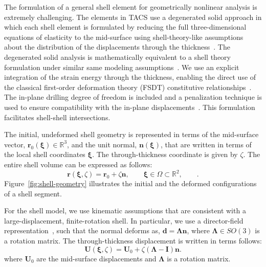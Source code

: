 \documentclass[]{aiaa-tc}
\newcommand{\mb}{\mathbf}
\newcommand{\mbs}{\boldsymbol}
\begin{document}
The formulation of a general shell element for geometrically nonlinear
analysis is extremely challenging. The elements in TACS use a
degenerated solid approach in which each shell element is formulated
by reducing the full three-dimensional equations of elasticity to the
mid-surface using shell-theory-like assumptions about the distribution
of the displacements through the thickness~\cite{Ahmad:1970:ATS,
  Bathe:1980:GMN, Parisch:1978:GNA, Hughes:1981:NFE}.  The degenerated
solid analysis is mathematically equivalent to a shell theory
formulation under similar same modeling
assumptions~\cite{Buechter:1992:STD}.  We use an explicit integration
of the strain energy through the thickness, enabling the direct use of
the classical first-order deformation theory (FSDT) constitutive
relationships~\cite{Milford:1986:DIF, Buechter:1992:STD}. The
in-plane drilling degree of freedom is included and a penalization
technique is used to ensure compatibility with the in-plane
displacements~\cite{Hughes:1989:DDF, Simo:1992:FFE,
  Fox:1992:DRF}. This formulation facilitates shell-shell
intersections.

The initial, undeformed shell geometry is represented in terms of the
mid-surface vector, $\mb{r}_{0}(\mbs{\xi}) \in \mathbb{R}^{3}$, and
the unit normal, $\mb{n}(\mbs{\xi})$, that are written in terms of the
local shell coordinates $\mbs{\xi}$. The through-thickness coordinate
is given by $\zeta$. The entire shell volume can be expressed as
follows:
%
\begin{equation} 
  \mb{r}(\mbs{\xi}, \zeta) = 
  \mb{r}_{0} + \zeta \mb{n}, 
  \qquad \mbs{\xi} \in \Omega \subset \mathbb{R}^{2}, \qquad.
  \label{eqn:mid-surface}
\end{equation}
Figure~\ref{fig:shell-geometry} illustrates the initial and the deformed
configurations of a shell segment. 

For the shell model, we use kinematic assumptions that are consistent
with a large-displacement, finite-rotation shell. In particular, we
use a director-field representation~\cite{Simo:1989:SRG1}, such that
the normal deforms as, $\mb{d} = \mbs{\Lambda} \mb{n}$, where
$\mbs{\Lambda} \in SO(3)$ is a rotation matrix. The through-thickness
displacement is written in terms follows:
%
\begin{equation*}
  \label{eqn:displacement-field}
  \mb{U}(\mbs{\xi}, \zeta) = \mb{U}_{0} + \zeta (\mbs{\Lambda} - \mb{I}) \mb{n}.
\end{equation*}
where $\mb{U}_{0}$ are the mid-surface displacements and $\mbs{\Lambda}$ is
a rotation matrix.
\end{document}
